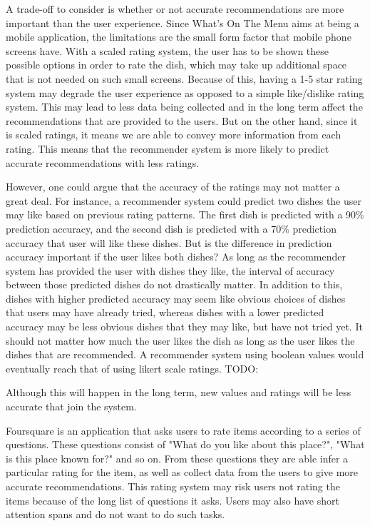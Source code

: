 A trade-off to consider is whether or not accurate recommendations are more important than the user experience. Since What's On The Menu aims at being a mobile application, the limitations are the small form factor that mobile phone screens have. With a scaled rating system, the user has to be shown these possible options in order to rate the dish, which may take up additional space that is not needed on such small screens. Because of this, having a 1-5 star rating system may degrade the user experience as opposed to a simple like/dislike rating system. This may lead to less data being collected and in the long term affect the recommendations that are provided to the users. But on the other hand, since it is scaled ratings, it means we are able to convey more information from each rating. This means that the recommender system is more likely to predict accurate recommendations with less ratings. 

However, one could argue that the accuracy of the ratings may not matter a great deal. For instance, a recommender system could predict two dishes the user  may like based on previous rating patterns. The first dish is predicted with a 90\% prediction accuracy, and the second dish is predicted with a 70\% prediction accuracy that user will like these dishes. But is the difference in prediction accuracy important if the user likes both dishes? As long as the recommender system has provided the user with dishes they like, the interval of accuracy between those predicted dishes do not drastically matter. In addition to this, dishes with higher predicted accuracy may seem like obvious choices of dishes that users may have already tried, whereas dishes with a lower predicted accuracy may be less obvious dishes that they may like, but have not tried yet. It should not matter how much the user likes the dish as long as the user likes the dishes that are recommended. A recommender system using boolean values would eventually reach that of using likert scale ratings.
TODO: 

Although this will happen in the long term, new values and ratings will be less accurate that join the system. 


Foursquare is an application that asks users to rate items according to a series of questions. These questions consist of "What do you like about this place?", "What is this place known for?" and so on. From these questions they are able infer a particular rating for the item, as well as collect data from the users to give more accurate recommendations. This rating system may risk users not rating the items because of the long list of questions it asks. Users may also have short attention spans and do not want to do such tasks.

